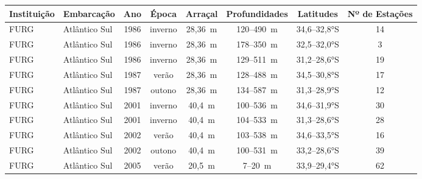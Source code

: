 \documentclass[a4paper,11pt,twoside,showtrims,onecolumn,openright,final]{memoir}
\begin{document}
\begin{table}
\begin{tiny}
\begin{tabular*}{\textwidth}{l@{\extracolsep{\fill}}lcccccc}
\toprule
Instituição	&       Embarcação	 & Ano	& Época		& Arraçal	& Profundidades & Latitudes	& Nº de Estações	\\
\midrule
 FURG		&	Atlântico Sul    & 1986 &         inverno &   28,36~m &     120--490~m &   34,6--32,8°S &          14 		\\
 FURG		&	Atlântico Sul    & 1986 &         inverno &   28,36~m &     178--350~m &   32,5--32,0°S &           3 	\\
 FURG		&	Atlântico Sul    & 1986 &         inverno &   28,36~m &     129--511~m &   31,2--28,6°S &          19 	\\
 FURG		&	Atlântico Sul    & 1987 &         verão &   28,36~m &     128--488~m &   34,5--30,8°S &          17 	\\
 FURG		&	Atlântico Sul    & 1987 &         outono &   28,36~m &     134--587~m &   31,3--28,9°S &          12 	\\
 FURG		&	Atlântico Sul    & 2001 &         inverno &    40,4~m &     100--536~m &   34,6--31,9°S &          30 	\\
 FURG		&	Atlântico Sul    & 2001 &         inverno &    40,4~m &     104--533~m &   31,3--28,6°S &          28 	\\
 FURG		&	Atlântico Sul    & 2002 &         verão &    40,4~m &     103--538~m &   34,6--33,5°S &          16 	\\
 FURG		&	Atlântico Sul    & 2002 &         outono &    40,4~m &     100--531~m &   33,2--28,6°S &          39 	\\
 FURG		&	Atlântico Sul    & 2005 &         verão &    20,5~m &       7--20~m &   33,9--29,4°S &          62 	\\
\bottomrule
\end{tabular*}
\end{tiny}
\end{table}




\end{document}
